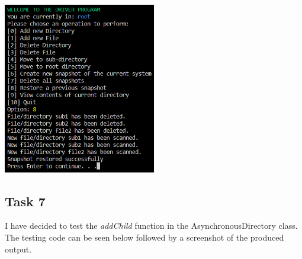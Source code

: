 \documentclass{article}
\begin{document}
\includegraphics[width=0.5\textwidth]{Task6_4.png}
\subsection*{Task 7}
I have decided to test the \textit{addChild} function in the AsynchronousDirectory class. The testing code can be seen below
followed by a screenshot of the produced output.
\end{document}
